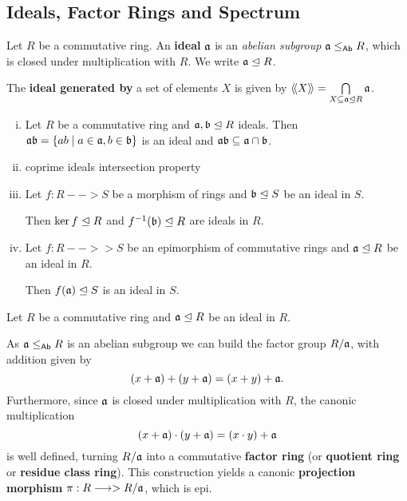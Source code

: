 	\subsection{Ideals, Factor Rings and Spectrum}
	\begin{definition}
		Let $R$ be a commutative ring. An \textbf{ideal} $\mathfrak{a}$ is an \textit{abelian subgroup} $\mathfrak{a} \leq_{\textsf{Ab}} R$, which is closed under multiplication with $R$. We write $\mathfrak{a} \trianglelefteq R$.

		The \textbf{ideal generated by} a set of elements $X$ is given by $\langle\!\langle X \rangle\!\rangle = \bigcap \limits_{X \subseteq \mathfrak{a} \trianglelefteq R} \mathfrak{a}$.
	\end{definition}

	\begin{lemma}
		\vspace{-1.5em}\begin{enumerate}[(i)]
			\item{
				Let $R$ be a commutative ring and $\mathfrak{a},\mathfrak{b} \trianglelefteq R$ ideals. Then $\mathfrak{ab} = \{ab \mid a \in \mathfrak{a}, b \in \mathfrak{b}\}$ is an ideal and $\mathfrak{ab} \subseteq \mathfrak{a} \cap \mathfrak{b}$.
			}
			\item{
				coprime ideals intersection property
			}
			\item{
				Let $f:R --> S$ be a morphism of rings and $\mathfrak{b} \trianglelefteq S$ be an ideal in $S$.

				Then $\ker f \trianglelefteq R$ and $f^{-1}(\mathfrak{b}) \trianglelefteq R$ are ideals in $R$.
			}
			\item{
				Let $f:R -->> S$ be an epimorphism of commutative rings and $\mathfrak{a} \trianglelefteq R$ be an ideal in $R$.

				Then $f(\mathfrak{a}) \trianglelefteq S$ is an ideal in $S$.
			}
		\end{enumerate}
	\end{lemma}

	\begin{definition}
		Let $R$ be a commutative ring and $\mathfrak{a} \trianglelefteq R$ be an ideal in $R$. 

		As $\mathfrak{a} \leq_{\textsf{Ab}} R$ is an abelian subgroup we can build the factor group $R/\mathfrak{a}$, with addition given by
		\begin{equation*}
			(x + \mathfrak{a}) + (y + \mathfrak{a}) = (x+y) + \mathfrak{a}.
		\end{equation*}
		Furthermore, since $\mathfrak{a}$ is closed under multiplication with $R$, the canonic multiplication
		\begin{equation*}
			(x + \mathfrak{a}) \cdot (y + \mathfrak{a}) = (x \cdot y) + \mathfrak{a}
		\end{equation*}
		is well defined, turning $R / \mathfrak{a}$ into a commutative \textbf{factor ring} (or \textbf{quotient ring} or \textbf{residue class ring}). This construction yields a canonic \textbf{projection morphism} $\pi: R -->> R/\mathfrak{a}$, which is epi.
	\end{definition}

